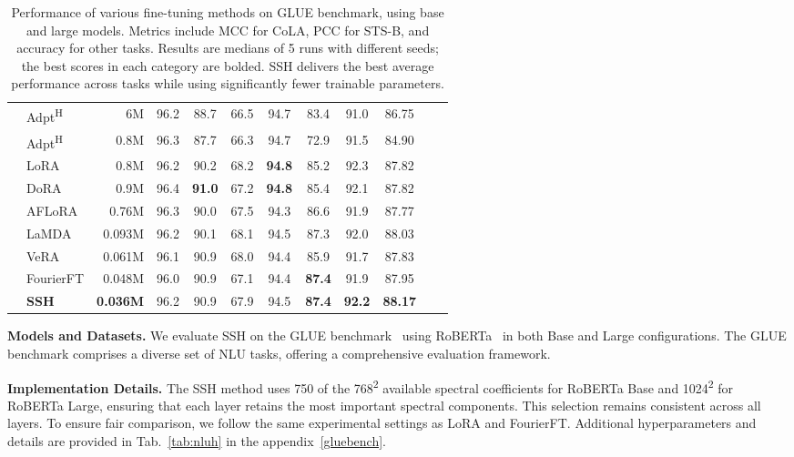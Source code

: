 \begin{table*}[!ht]
{\begin{tabular}{cl|r|ccccccccc}
& Adpt\textsuperscript{H} & 6M & 96.2 & 88.7 & 66.5 & 94.7 & 83.4 & 91.0 & 86.75 \\
& Adpt\textsuperscript{H} & 0.8M & 96.3 & 87.7 & 66.3 & 94.7 & 72.9 & 91.5 & 84.90 \\
& LoRA & 0.8M & 96.2 & 90.2 & 68.2 & \textbf{94.8} & 85.2 & 92.3 & 87.82 \\
& DoRA & 0.9M & 96.4 & \textbf{91.0} & 67.2 & \textbf{94.8} & 85.4 & 92.1 & 87.82 \\
& AFLoRA & 0.76M & 96.3 & 90.0 & 67.5 & 94.3 & 86.6 & 91.9 & 87.77 \\
& LaMDA & 0.093M &  96.2 & 90.1 & 68.1 & 94.5 & 87.3 & 92.0 & 88.03 \\
& VeRA & 0.061M & 96.1 & 90.9 & 68.0 & 94.4 & 85.9 & 91.7 & 87.83 \\
& FourierFT & 0.048M & 96.0 & 90.9 & 67.1 & 94.4 & \textbf{87.4} & 91.9 & 87.95 \\
\rowcolor{green!17}
& \textbf{SSH} & \textbf{0.036M} & 96.2 & 90.9 & 67.9 & 94.5 & \textbf{87.4} & \textbf{92.2} & \textbf{88.17} \\
\bottomrule
\end{tabular}%
}
\caption{\small Performance of various fine-tuning methods on GLUE benchmark, using base and large models. Metrics include MCC for CoLA, PCC for STS-B, and accuracy for other tasks. Results are medians of 5 runs with different seeds; the best scores in each category are bolded. SSH delivers the best average performance across tasks while using significantly fewer trainable parameters.}
\label{tab:nlup}
\end{table*}





\noindent \textbf{Models and Datasets.}  
We evaluate SSH on the GLUE benchmark~\cite{wang2019glue} using RoBERTa~\cite{liu2019roberta} in both Base and Large configurations. The GLUE benchmark comprises a diverse set of NLU tasks, offering a comprehensive evaluation framework.


\noindent \textbf{Implementation Details.}  
The SSH method uses 750 of the 768\textsuperscript{2} available spectral coefficients for RoBERTa Base and 1024\textsuperscript{2} for RoBERTa Large, ensuring that each layer retains the most important spectral components. This selection remains consistent across all layers. To ensure fair comparison, we follow the same experimental settings as LoRA and FourierFT. Additional hyperparameters and details are provided in Tab.~\ref{tab:nluh} in the appendix~\ref{gluebench}.


